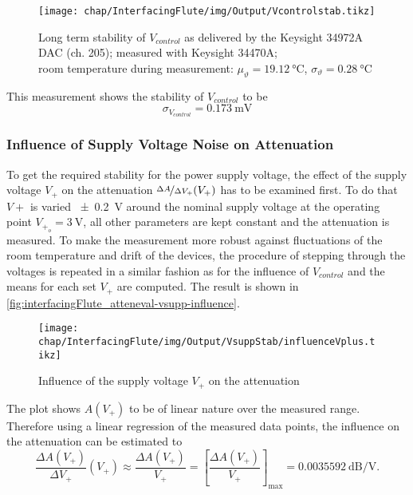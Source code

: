 \begin{figure}[tb]
	\centering
	\texttt{[image: chap/InterfacingFlute/img/Output/Vcontrolstab.tikz]}
	\caption{Long term stability of $V_{control}$ as delivered by the Keysight 34972A DAC (ch. 205); measured with Keysight 34470A;\\room temperature during measurement: $\mu_\vartheta=\SI{19.12}{\degreeCelsius}$, $\sigma_\vartheta=\SI{0.28}{\degreeCelsius}$}
	\label{fig:interfacingFlute_vcontrolstab_longterm}
\end{figure}

This measurement shows the stability of $V_{control}$ to be
\begin{equation}
\sigma_{V_{control}} = \SI{0.173}{\milli\volt}
\end{equation}

\subsubsection{Influence of Supply Voltage Noise on Attenuation}
To get the required stability for the power supply voltage, the effect of the supply voltage $V_+$ on the attenuation $\nicefrac{\Delta A}{\Delta V_+} (V_+)$ has to be examined first. To do that $V+$ is varied \SI{\pm0.2}{\volt} around the nominal supply voltage at the operating point $V_{+_o}=\SI{3}{\volt}$, all other parameters are kept constant and the attenuation is measured. To make the measurement more robust against fluctuations of the room temperature and drift of the devices, the procedure of stepping through the voltages is repeated in a similar fashion as for the influence of $V_{control}$ and the means for each set $V_+$ are computed. The result is shown in \autoref{fig:interfacingFlute_atteneval-vsupp-influence}.

\begin{figure}[tb]
	\centering
	\texttt{[image: chap/InterfacingFlute/img/Output/VsuppStab/influenceVplus.tikz]}
	\caption{Influence of the supply voltage $V_+$ on the attenuation}
	\label{fig:interfacingFlute_atteneval-vsupp-influence}
\end{figure}

The plot shows $A(V_+)$ to be of linear nature over the measured range.
Therefore using a linear regression of the measured data points, the influence on the attenuation can be estimated to
\begin{equation}
\frac{\Delta A(V_+)}{\Delta V_+}(V_+) 
\approx \frac{\Delta A(V_+)}{V_+} 
= \left[\frac{\Delta A(V_+)}{V_+}\right]_\text{max}
=\SI{0.0035592}{\dB\per\volt}.
\end{equation}

